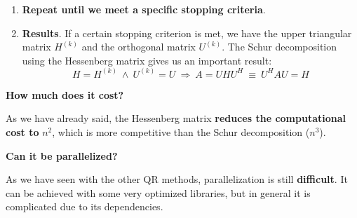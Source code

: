 \begin{enumerate}
    \item \textbf{Repeat until we meet a specific stopping criteria}.
    
    \item \textbf{Results}. If a certain stopping criterion is met, we have the upper triangular matrix $H^{\left(k\right)}$ and the orthogonal matrix $U^{\left(k\right)}$. The Schur decomposition using the Hessenberg matrix gives us an important result:
    \begin{equation*}
        H = H^{\left(k\right)} \: \land \: U^{\left(k\right)} = U \: \Longrightarrow \: A = U H U^{H} \: \equiv \: U^{H} A U = H
    \end{equation*}
\end{enumerate}

\highspace
\begin{flushleft}
    \textcolor{Red2}{ \textbf{How much does it cost?}}
\end{flushleft}
As we have already said, the Hessenberg matrix \textbf{reduces the computational cost to} $n^{2}$, which is more competitive than the Schur decomposition ($n^{3}$).

\highspace
\begin{flushleft}
    \textcolor{Green3}{ \textbf{Can it be parallelized?}}
\end{flushleft}
As we have seen with the other QR methods, parallelization is still \textbf{difficult}. It can be achieved with some very optimized libraries, but in general it is complicated due to its dependencies.